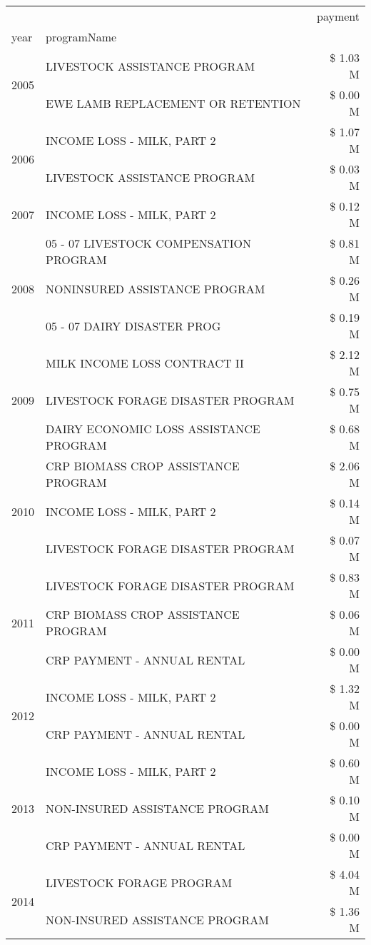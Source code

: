 \begin{tabular}{llr}
\toprule
 &  & payment \\
year & programName &  \\
\midrule
\multirow[t]{2}{*}{2005} & LIVESTOCK ASSISTANCE PROGRAM & \$ 1.03 M \\
 & EWE LAMB REPLACEMENT OR RETENTION & \$ 0.00 M \\
\cline{1-3}
\multirow[t]{2}{*}{2006} & INCOME LOSS - MILK, PART 2 & \$ 1.07 M \\
 & LIVESTOCK ASSISTANCE PROGRAM & \$ 0.03 M \\
\cline{1-3}
2007 & INCOME LOSS - MILK, PART 2 & \$ 0.12 M \\
\cline{1-3}
\multirow[t]{3}{*}{2008} & 05 - 07 LIVESTOCK COMPENSATION PROGRAM & \$ 0.81 M \\
 & NONINSURED ASSISTANCE PROGRAM & \$ 0.26 M \\
 & 05 - 07 DAIRY DISASTER PROG & \$ 0.19 M \\
\cline{1-3}
\multirow[t]{3}{*}{2009} & MILK INCOME LOSS CONTRACT II & \$ 2.12 M \\
 & LIVESTOCK FORAGE DISASTER  PROGRAM & \$ 0.75 M \\
 & DAIRY ECONOMIC LOSS ASSISTANCE PROGRAM & \$ 0.68 M \\
\cline{1-3}
\multirow[t]{3}{*}{2010} & CRP BIOMASS CROP ASSISTANCE PROGRAM & \$ 2.06 M \\
 & INCOME LOSS - MILK, PART 2 & \$ 0.14 M \\
 & LIVESTOCK FORAGE DISASTER PROGRAM & \$ 0.07 M \\
\cline{1-3}
\multirow[t]{3}{*}{2011} & LIVESTOCK FORAGE DISASTER PROGRAM & \$ 0.83 M \\
 & CRP BIOMASS CROP ASSISTANCE PROGRAM & \$ 0.06 M \\
 & CRP PAYMENT - ANNUAL RENTAL & \$ 0.00 M \\
\cline{1-3}
\multirow[t]{2}{*}{2012} & INCOME LOSS - MILK, PART 2 & \$ 1.32 M \\
 & CRP PAYMENT - ANNUAL RENTAL & \$ 0.00 M \\
\cline{1-3}
\multirow[t]{3}{*}{2013} & INCOME LOSS - MILK, PART 2 & \$ 0.60 M \\
 & NON-INSURED ASSISTANCE PROGRAM & \$ 0.10 M \\
 & CRP PAYMENT - ANNUAL RENTAL & \$ 0.00 M \\
\cline{1-3}
\multirow[t]{3}{*}{2014} & LIVESTOCK FORAGE PROGRAM & \$ 4.04 M \\
 & NON-INSURED ASSISTANCE PROGRAM & \$ 1.36 M \\

\end{tabular}
